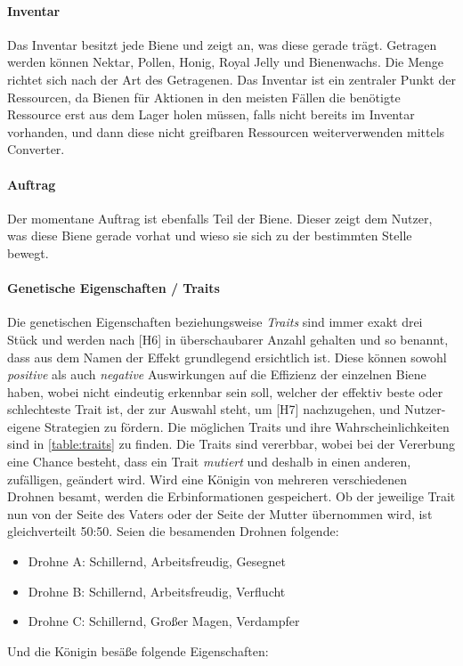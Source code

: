 \paragraph{Inventar} 
Das Inventar besitzt jede Biene und zeigt an, was diese gerade trägt. Getragen werden können Nektar, Pollen, Honig, Royal Jelly und Bienenwachs. Die Menge richtet sich nach der Art des Getragenen. Das Inventar ist ein zentraler Punkt der Ressourcen, da Bienen für Aktionen in den meisten Fällen die benötigte Ressource erst aus dem Lager holen müssen, falls nicht bereits im Inventar vorhanden, und dann diese nicht greifbaren Ressourcen weiterverwenden mittels Converter.

\paragraph{Auftrag} 
Der momentane Auftrag ist ebenfalls Teil der Biene. Dieser zeigt dem Nutzer, was diese Biene gerade vorhat und wieso sie sich zu der bestimmten Stelle bewegt.

\paragraph{Genetische Eigenschaften / Traits} 
Die genetischen Eigenschaften beziehungsweise \textit{Traits} sind immer exakt drei Stück und werden nach [H6] in überschaubarer Anzahl gehalten und so benannt, dass aus dem Namen der Effekt grundlegend ersichtlich ist. Diese können sowohl \textit{positive} als auch \textit{negative} Auswirkungen auf die Effizienz der einzelnen Biene haben, wobei nicht eindeutig erkennbar sein soll, welcher der effektiv beste oder schlechteste Trait ist, der zur Auswahl steht, um [H7] nachzugehen, und Nutzer-eigene Strategien zu fördern. Die möglichen Traits und ihre Wahrscheinlichkeiten sind in \autoref{table:traits} zu finden. Die Traits sind vererbbar, wobei bei der Vererbung eine Chance besteht, dass ein Trait \textit{mutiert} und deshalb in einen anderen, zufälligen, geändert wird. Wird eine Königin von mehreren verschiedenen Drohnen besamt, werden die Erbinformationen gespeichert. Ob der jeweilige Trait nun von der Seite des Vaters oder der Seite der Mutter übernommen wird, ist gleichverteilt 50:50. Seien die besamenden Drohnen folgende:

\begin{itemize}
    \item Drohne A: Schillernd, Arbeitsfreudig, Gesegnet
    \item Drohne B: Schillernd, Arbeitsfreudig, Verflucht
    \item Drohne C: Schillernd, Großer Magen, Verdampfer
\end{itemize} Und die Königin besäße folgende Eigenschaften:

